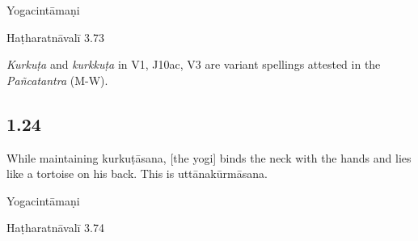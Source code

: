 \begin{ekdosis}
\begin{sources}[hp01_023]
\end{sources}

\begin{testimonia}[hp01_023]
Yogacintāmaṇi

\begin{versinnote}
\end{versinnote}

Haṭharatnāvalī 3.73

\begin{versinnote}
\end{versinnote}

\end{testimonia}

\begin{philcomm}[hp01_023]
\emph{Kurkuṭa} and \emph{kurkkuṭa} in V1, J10ac, V3 are variant spellings attested in the \emph{Pañcatantra} (M-W).
\end{philcomm}

\subsection*{1.24}
\begin{translation}[hp01_024]
While maintaining kurkuṭāsana, [the yogi] binds the neck with the hands and lies like a tortoise on his back. This is uttānakūrmāsana.
\end{translation}

\begin{testimonia}[hp01_024]
Yogacintāmaṇi

\begin{versinnote}
\end{versinnote}

Haṭharatnāvalī 3.74

\begin{versinnote}
\end{versinnote}


\end{testimonia}
\end{ekdosis}
